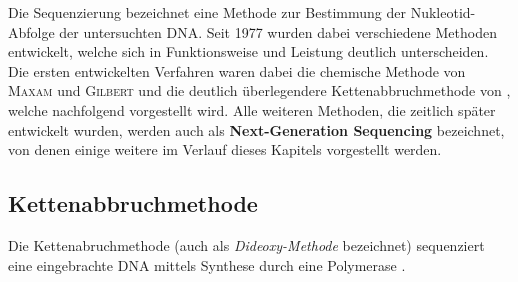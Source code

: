 Die Sequenzierung bezeichnet eine Methode zur Bestimmung der Nukleotid-Abfolge der untersuchten DNA. Seit 1977 wurden dabei verschiedene Methoden entwickelt, welche sich in Funktionsweise und Leistung deutlich unterscheiden. Die ersten entwickelten Verfahren waren dabei die chemische Methode von \textsc{Maxam} und \textsc{Gilbert} und die deutlich überlegendere Kettenabbruchmethode von \citet{Sanger1977}, welche nachfolgend vorgestellt wird. Alle weiteren Methoden, die zeitlich später entwickelt wurden, werden auch als \textbf{Next-Generation Sequencing} bezeichnet, von denen einige weitere im Verlauf dieses Kapitels vorgestellt werden.
\subsection{Kettenabbruchmethode}
\label{sec:bio:seq:kette}

Die Kettenabruchmethode (auch als \textit{Dideoxy-Methode} bezeichnet) sequenziert eine eingebrachte DNA mittels Synthese durch eine Polymerase \citep{Jansohn2011}. 

